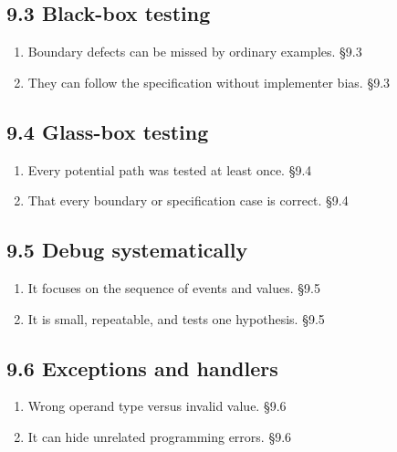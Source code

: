 \documentclass[11pt]{article}
\begin{document}
\begin{keepsection}\subsection{9.3 Black-box testing}

\begin{enumerate}
\item Boundary defects can be missed by ordinary examples. \hfill{\small\color{FAUblue}§9.3}
\item They can follow the specification without implementer bias. \hfill{\small\color{FAUblue}§9.3}
\end{enumerate}

\end{keepsection}
\begin{keepsection}\subsection{9.4 Glass-box testing}

\begin{enumerate}
\item Every potential path was tested at least once. \hfill{\small\color{FAUblue}§9.4}
\item That every boundary or specification case is correct. \hfill{\small\color{FAUblue}§9.4}
\end{enumerate}

\end{keepsection}
\begin{keepsection}\subsection{9.5 Debug systematically}

\begin{enumerate}
\item It focuses on the sequence of events and values. \hfill{\small\color{FAUblue}§9.5}
\item It is small, repeatable, and tests one hypothesis. \hfill{\small\color{FAUblue}§9.5}
\end{enumerate}

\end{keepsection}
\begin{keepsection}\subsection{9.6 Exceptions and handlers}

\begin{enumerate}
\item Wrong operand type versus invalid value. \hfill{\small\color{FAUblue}§9.6}
\item It can hide unrelated programming errors. \hfill{\small\color{FAUblue}§9.6}
\end{enumerate}

\end{keepsection}
\end{document}
